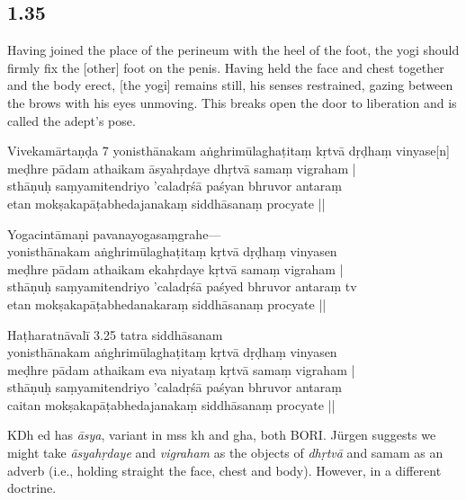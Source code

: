 \begin{ekdosis}
\subsection*{1.35}
\begin{translation}[hp01_035]
Having joined the place of the perineum with the heel of the foot, the yogi should firmly fix the [other] foot on the penis. Having held the face and chest together and the body erect, [the yogi] remains still, his senses restrained, gazing between the brows with his eyes unmoving. This breaks open the door to liberation and is called the adept’s pose.
\end{translation}

\begin{sources}[hp01_035]
Vivekamārtaṇḍa 7
\startverse
yonisthānakam aṅghrimūlaghaṭitaṃ kṛtvā dṛḍhaṃ vinyase[n] \\
meḍhre pādam athaikam āsyahṛdaye dhṛtvā samaṃ vigraham |\\
sthāṇuḥ saṃyamitendriyo 'caladṛśā paśyan bhruvor antaraṃ\\
etan  mokṣakapāṭabhedajanakaṃ siddhāsanaṃ procyate ||
\endverse
\end{sources}

\begin{testimonia}[hp01_035]
Yogacintāmaṇi
\startverse
pavanayogasaṃgrahe—\\
yonisthānakam aṅghrimūlaghaṭitaṃ kṛtvā dṛḍhaṃ vinyasen\\
meḍhre pādam athaikam ekahṛdaye kṛtvā samaṃ vigraham |\\
sthāṇuḥ saṃyamitendriyo 'caladṛśā paśyed bhruvor antaraṃ tv\\
etan mokṣakapāṭabhedanakaraṃ siddhāsanaṃ procyate ||
\endverse

Haṭharatnāvalī 3.25
\startverse
tatra siddhāsanam\\
yonisthānakam aṅghrimūlaghaṭitaṃ kṛtvā dṛḍhaṃ vinyasen\\
meḍhre pādam athaikam eva niyataṃ kṛtvā samaṃ vigraham |\\
sthāṇuḥ saṃyamitendriyo 'caladṛśā paśyan bhruvor antaraṃ\\
caitan mokṣakapāṭabhedajanakaṃ siddhāsanaṃ procyate ||
\endverse
\end{testimonia}

\begin{philcomm}[hp01_035]
KDh ed has \emph{āsya}, variant in mss kh and gha, both BORI.
Jürgen suggests we might take \emph{āsyahṛdaye} and \emph{vigraham} as the objects of \emph{dhṛtvā} and samam as an adverb (i.e., holding straight the face, chest and body). However, in a different doctrine.
\end{philcomm}


\end{ekdosis}
